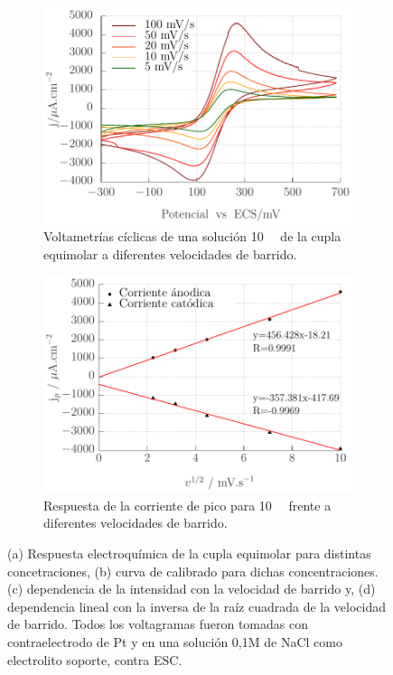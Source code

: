 \begin{figure}[ht]
 	     	\begin{subfigure}[t]{0.495\textwidth}
         		\includegraphics[width=\textwidth]{Graficos/Velocidades_Fe.pdf}
        	    \caption{Voltametrías cíclicas de una solución \SI{10}{\milli\Molar} de la cupla equimolar \fe\space a diferentes velocidades de barrido.}
        	    \label{fig:Fe_c}
     		 	\end{subfigure}
     	 	\begin{subfigure}[t]{0.495\textwidth}
        		\includegraphics[width=\textwidth]{Graficos/VelocidadesCal_Fe.pdf}
       			\caption[Respuesta a diferentes velocidades de barrido para \fe]{Respuesta de la corriente de pico para \fe\space \SI{10}{\milli\Molar} frente a diferentes velocidades de barrido.}
         		\label{fig:Fe_d}
     			\end{subfigure}
     		 \caption[Respuesta electroquímica para \fe]{(a) Respuesta electroquímica de la cupla equimolar \fe\space para distintas concetraciones, (b) curva de calibrado para dichas concentraciones. (c) dependencia de la intensidad con la velocidad de barrido y, (d) dependencia lineal con la inversa de la raíz cuadrada de la velocidad de barrido. Todos los voltagramas fueron tomadas con contraelectrodo de Pt y en una solución 0,1M de NaCl como electrolito soporte, contra ESC.}
     		 \label{fig:ferro-ferri-CV}
     		 \end{figure}

